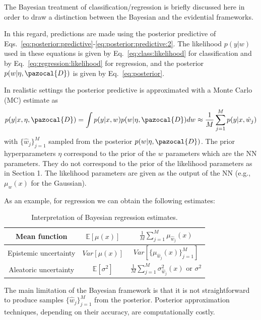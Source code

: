 The Bayesian treatment of classification/regression is briefly discussed here in order to draw a distinction between the Bayesian and the evidential frameworks.

In this regard, predictions are made using the posterior predictive of Eqs.~\eqref{eq:posterior:predictive}-\eqref{eq:posterior:predictive:2}. 
The likelihood $p(y|w)$ used in these equations is given by Eq.~\eqref{eq:class:likelihood} for classification and by Eq.~\eqref{eq:regression:likelihood} for regression, and the posterior $p(w|\eta, \pazocal{D})$ is given by Eq.~\eqref{eq:posterior}.


In realistic settings the posterior predictive is approximated with a Monte Carlo (MC) estimate as
\begin{equation}\label{eq:posterior:predictive:mc}
	p(y|x, \eta, \pazocal{D}) = \int p(y|x, w)p(w|\eta, \pazocal{D}) dw \approx 
	\frac{1}{M}\sum_{j = 1}^{M}p(y|x, \hat{w}_j)
\end{equation}
with $\{\hat{w}_j\}_{j=1}^{M}$ sampled from the posterior $p(w|\eta, \pazocal{D})$.
The prior hyperparameters $\eta$ correspond to the prior of the $w$ parameters which are the NN parameters. 
They do not correspond to the prior of the likelihood parameters as in Section 1. 
The likelihood parameters are given as the output of the NN (e.g., $\mu_w(x)$ for the Gaussian).

As an example, for regression we can obtain the following estimates:
\begin{table}[H]
	\centering
	\begin{tabular}{ | c | c | c  |} 
		\hline
		Mean function & $\mathbb{E}[\mu(x)]$ & $\frac{1}{M}\sum_{j=1}^{M}\mu_{\hat{w}_j}(x)$ \\
		\hline
		Epistemic uncertainty & $Var[\mu(x)]$ & $Var\left[\{\mu_{\hat{w}_j}(x)\}_{j=1}^{M}\right]$\\
		\hline
		Aleatoric uncertainty & $\mathbb{E}[\sigma^2]$ & $\frac{1}{M}\sum_{j=1}^{M}\sigma^2_{\hat{w}_j}(x)$ or $\sigma^2$ \\
			\hline
	\end{tabular}
	\caption{Interpretation of Bayesian regression estimates.}
	\label{tab:bayes:regression}
\end{table}

The main limitation of the Bayesian framework is that it is not straightforward to produce samples $\{\hat{w}_j\}_{j=1}^{M}$ from the posterior.
Posterior approximation techniques, depending on their accuracy, are computationally costly.

